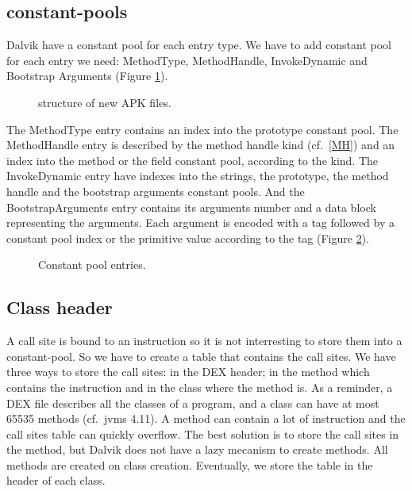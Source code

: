 \documentclass{sig-alternate}
\def \DALVIK{Dalvik\xspace}
\begin{document}
  \subsection{constant-pools}
    \label{CP}

    \DALVIK have a constant pool for each entry type.
    We have to add constant pool for each entry we need:
    MethodType, MethodHandle, InvokeDynamic and Bootstrap Arguments (Figure \ref{SNA}).

    \begin{figure}[!h]
      \centering \resizebox{.45\linewidth}{!}{}
      \caption{structure of new APK files.}
      \label{SNA}
    \end{figure}

    The MethodType entry contains an index into the prototype constant pool.
    The MethodHandle entry is described by the method handle kind (cf.~\ref{MH})
    and an index into the method or the field constant pool, according to the kind.
    The InvokeDynamic entry have indexes into the strings, the prototype,
    the method handle and the bootstrap arguments constant pools.
    And the BootstrapArguments entry contains its arguments number
    and a data block representing the arguments.
    Each argument is encoded with a tag
    followed by a constant pool index or the primitive value according to the tag (Figure \ref{CPentries}).

    \begin{figure}[!h]
      \centering 
      \centering 
      \centering 
      \centering \vspace{-1.5em}
      \caption{Constant pool entries.}
      \label{CPentries}
    \end{figure}

  \subsection{Class header}

    A call site is bound to an instruction so it is not interresting to store them into a constant-pool.
    So we have to create a table that contains the call sites.
    We have three ways to store the call sites: in the DEX header; in the method which contains the instruction and in the class where the method is.
    As a reminder, a DEX file describes all the classes of a program, and a class can have at most 65535 methods (cf.~jvms 4.11).
    A method can contain a lot of instruction and the call sites table can quickly overflow.
    The best solution is to store the call sites in the method, but \DALVIK does not have a lazy mecanism to create methods.
    All methods are created on class creation.
    Eventually, we store the table in the header of each class.
\end{document}
